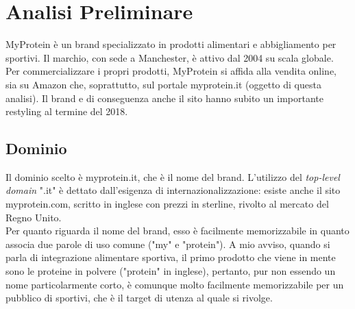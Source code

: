 \section{Analisi Preliminare}
MyProtein è un brand specializzato in prodotti alimentari e abbigliamento per sportivi. Il marchio, con sede a Manchester, è attivo dal 2004 su scala globale. Per commercializzare i propri prodotti, MyProtein si affida alla vendita online, sia su Amazon che, soprattutto, sul portale myprotein.it (oggetto di questa analisi). Il brand e di conseguenza anche il sito hanno subito un importante restyling al termine del 2018.\\
\subsection{Dominio}
Il dominio scelto è myprotein.it, che è il nome del brand. L'utilizzo del \textit{top-level domain} ".it" è dettato dall'esigenza di internazionalizzazione: esiste anche il sito myprotein.com, scritto in inglese con prezzi in sterline, rivolto al mercato del Regno Unito.\\
Per quanto riguarda il nome del brand, esso è facilmente memorizzabile in quanto associa due parole di uso comune ("my" e "protein"). A mio avviso, quando si parla di integrazione alimentare sportiva, il primo prodotto che viene in mente sono le proteine in polvere ("protein" in inglese), pertanto, pur non essendo un nome particolarmente corto, è comunque molto facilmente memorizzabile per un pubblico di sportivi, che è il target di utenza al quale si rivolge.